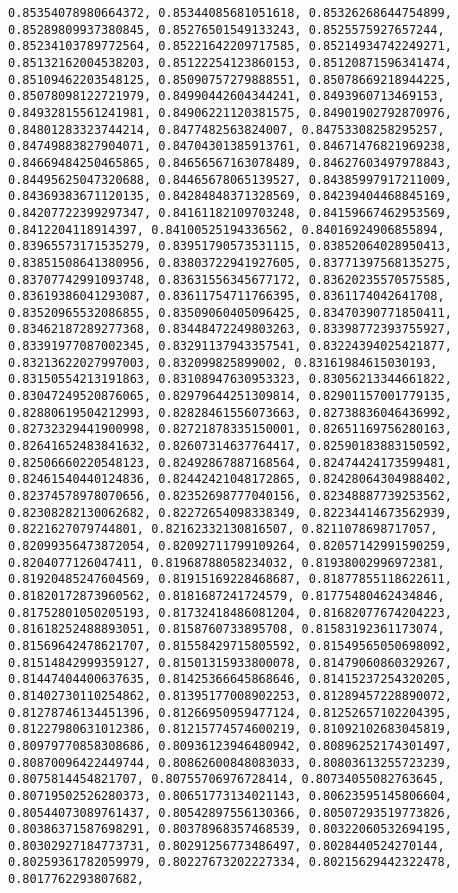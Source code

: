 \documentclass[11pt]{article}
\begin{document}
\begin{Verbatim}[commandchars=\\\{\}]
0.85354078980664372, 0.85344085681051618, 0.85326268644754899, 0.85289809937380845, 0.85276501549133243, 0.8525575927657244, 0.85234103789772564, 0.85221642209717585, 0.85214934742249271, 0.85132162004538203, 0.85122254123860153, 0.85120871596341474, 0.85109462203548125, 0.85090757279888551, 0.85078669218944225, 0.85078098122721979, 0.84990442604344241, 0.8493960713469153, 0.84932815561241981, 0.84906221120381575, 0.84901902792870976, 0.84801283323744214, 0.8477482563824007, 0.84753308258295257, 0.84749883827904071, 0.84704301385913761, 0.84671476821969238, 0.84669484250465865, 0.84656567163078489, 0.84627603497978843, 0.84495625047320688, 0.84465678065139527, 0.84385997917211009, 0.84369383671120135, 0.84284848371328569, 0.84239404468845169, 0.84207722399297347, 0.84161182109703248, 0.84159667462953569, 0.8412204118914397, 0.84100525194336562, 0.84016924906855894, 0.83965573171535279, 0.83951790573531115, 0.83852064028950413, 0.83851508641380956, 0.83803722941927605, 0.83771397568135275, 0.83707742991093748, 0.83631556345677172, 0.83620235570575585, 0.83619386041293087, 0.83611754711766395, 0.8361174042641708, 0.83520965532086855, 0.83509060405096425, 0.83470390771850411, 0.83462187289277368, 0.83448472249803263, 0.83398772393755927, 0.83391977087002345, 0.83291137943357541, 0.83224394025421877, 0.83213622027997003, 0.832099825899002, 0.83161984615030193, 0.83150554213191863, 0.83108947630953323, 0.83056213344661822, 0.83047249520876065, 0.82979644251309814, 0.82901157001779135, 0.82880619504212993, 0.82828461556073663, 0.82738836046436992, 0.82732329441900998, 0.82721878335150001, 0.82651169756280163, 0.82641652483841632, 0.82607314637764417, 0.82590183883150592, 0.82506660220548123, 0.82492867887168564, 0.82474424173599481, 0.82461540440124836, 0.82442421048172865, 0.82428064304988402, 0.82374578978070656, 0.82352698777040156, 0.82348887739253562, 0.82308282130062682, 0.82272654098338349, 0.82234414673562939, 0.8221627079744801, 0.82162332130816507, 0.8211078698717057, 0.82099356473872054, 0.82092711799109264, 0.82057142991590259, 0.8204077126047411, 0.81968788058234032, 0.81938002996972381, 0.81920485247604569, 0.81915169228468687, 0.81877855118622611, 0.81820172873960562, 0.8181687241724579, 0.81775480462434846, 0.81752801050205193, 0.81732418486081204, 0.81682077674204223, 0.81618252488893051, 0.8158760733895708, 0.81583192361173074, 0.81569642478621707, 0.81558429715805592, 0.81549565050698092, 0.81514842999359127, 0.81501315933800078, 0.81479060860329267, 0.81447404400637635, 0.81425366645868646, 0.81415237254320205, 0.81402730110254862, 0.81395177008902253, 0.81289457228890072, 0.81278746134451396, 0.81266950959477124, 0.81252657102204395, 0.81227980631012386, 0.81215774574600219, 0.81092102683045819, 0.80979770858308686, 0.80936123946480942, 0.80896252174301497, 0.80870096422449744, 0.80862600848083033, 0.80803613255723239, 0.8075814454821707, 0.80755706976728414, 0.80734055082763645, 0.80719502526280373, 0.80651773134021143, 0.80623595145806604, 0.80544073089761437, 0.80542897556130366, 0.80507293519773826, 0.80386371587698291, 0.80378968357468539, 0.80322060532694195, 0.80302927184773731, 0.80291256773486497, 0.8028440524270144, 0.80259361782059979, 0.80227673202227334, 0.80215629442322478, 0.8017762293807682, 
\end{Verbatim}
\end{document}
